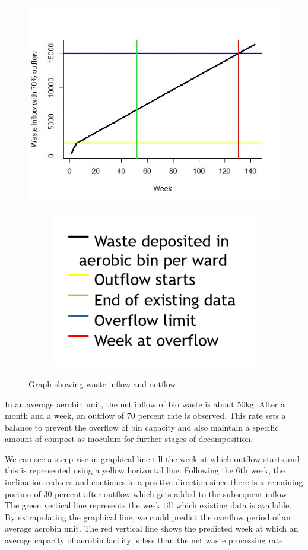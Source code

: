 \documentclass[12pt,a4paper]{  report}
\begin{document}
\begin{figure}
	\centering
	\includegraphics[width=0.5\linewidth]{waste_inflow_outflow}
	\begin{subfigure}{.2\textwidth}
		\centering
		\includegraphics[width=1\linewidth]{inflow_outflow_label}
	\end{subfigure}
	\caption{Graph showing waste inflow and outflow}
	\label{fig:wasteinflowoutflow}
\end{figure}

In an average aerobin unit, the net inflow of bio waste is about 50kg. After a month and a week, an outflow of 70 percent rate is observed. This rate sets a balance to prevent the overflow of bin capacity and also maintain a specific amount of compost as inoculum for further stages of decomposition. 

We can see a steep rise in graphical line till the week at which outflow starts,and this is represented using a yellow horizontal line. Following the 6th week, the inclination reduces and continues in a  positive direction since there is a remaining portion of 30 percent after outflow which gets added to the subsequent inflow . The green vertical line represents the week till which existing data is available. By extrapolating the graphical line, we could predict the overflow period of an average aerobin unit. The red vertical line shows the predicted week at which an average capacity of aerobin facility is less than the net waste processing rate. 	
\end{document}
